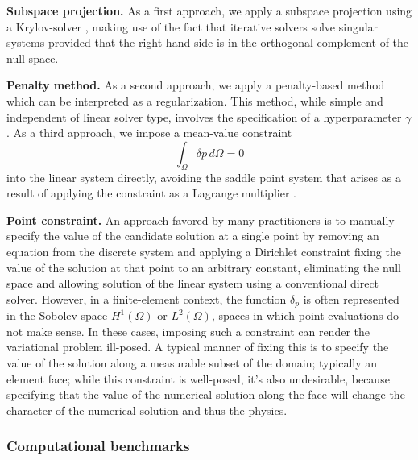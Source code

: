 \textbf{Subspace projection.} As a first approach, we apply a subspace projection using a Krylov-solver \cite{vorst_iterative_2003}, making use of the fact that iterative solvers solve singular systems provided that the right-hand side is in the orthogonal complement of the null-space.

\textbf{Penalty method.}
As a second approach, we apply a penalty-based method which can be interpreted as a regularization.
This method, while simple and independent of linear solver type, involves the specification of a hyperparameter $\gamma$.
As a third approach, we impose a mean-value constraint 
\begin{equation}
  \int_{\Omega}^{} \delta p \,d\Omega = 0
  \label{eq:mean_value_zero_condition}
\end{equation}
into the linear system directly, avoiding the saddle point system that arises as a result of applying the constraint as a Lagrange multiplier \cite{bochev_finite_2005}.

\textbf{Point constraint.} An approach favored by many practitioners is to manually specify the value of the candidate solution at a single point by removing an equation from the discrete system and applying a Dirichlet constraint fixing the value of the solution at that point to an arbitrary constant, eliminating the null space and allowing solution of the linear system using a conventional direct solver.
However, in a finite-element context, the function $\delta_p$ is often represented in the Sobolev space $H^1(\Omega)$ or $L^2(\Omega)$, spaces in which point evaluations do not make sense. 
In these cases, imposing such a constraint can render the variational problem ill-posed.
A typical manner of fixing this is to specify the value of the solution along a measurable subset of the domain; typically an element face; while this constraint is well-posed, it's also undesirable, because specifying that the value of the numerical solution along the face will change the character of the numerical solution and thus the physics.

\subsubsection{Computational benchmarks}

